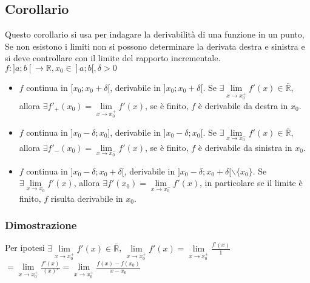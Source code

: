 \subsection{Corollario}
Questo corollario si usa per indagare la derivabilit\`a di una funzione in un punto, Se non esistono i limiti non si possono determinare la derivata destra e sinistra e si deve controllare con il limite del rapporto incrementale.\\
$f:]a;b[\rightarrow\mathbb{R},x_0\in]a;b[,\delta>0$
\begin{itemize}
\item $f$ continua in $[x_0;x_0+\delta[$, derivabile in $]x_0;x_0+\delta[$. Se $\exists\lim\limits_{x\rightarrow x_0^+}f'(x)\in\mathbb{\bar{R}}$, allora $\exists f'_+(x_0)=
\lim\limits_{x\rightarrow x_0^+}f'(x)$, se \`e finito, $f$ \`e derivabile da destra in $x_0$.
\item $f$ continua in $]x_0-\delta;x_0]$, derivabile in $]x_0-\delta;x_0[$. Se $\exists\lim\limits_{x\rightarrow x_0^-}f'(x)\in\mathbb{\bar{R}}$, allora $\exists f'_-(x_0)=
\lim\limits_{x\rightarrow x_0^-}f'(x)$, se \`e finito, $f$ \`e derivabile da sinistra in $x_0$.
\item $f$ continua in $]x_0-\delta;x_0+\delta[$, derivabile in $]x_0-\delta;x_0+\delta[\backslash\{x_0\}$. Se $\exists\lim\limits_{x\rightarrow x_0}f'(x)$, allora $\exists f'(x_0)=\lim\limits_{x\rightarrow x_0^-}f'(x)$, in particolare se il limite \`e finito, $f$ risulta derivabile in $x_0$.
\end{itemize}
\subsubsection{Dimostrazione}
Per ipotesi $\exists\lim\limits_{x\rightarrow x_0^+}f'(x)\in\mathbb{\bar{R}}$, $\lim\limits_{x\rightarrow x_0^+}f'(x)=\lim\limits_{x\rightarrow x_0^+}\frac{f'(x)}{1}$
$=\lim\limits_{x\rightarrow x_0^+}\frac{f'(x)}{(x)'}=\lim\limits_{x\rightarrow x_0^+}\frac{f(x)-f(x_0)}{x-x_0}$